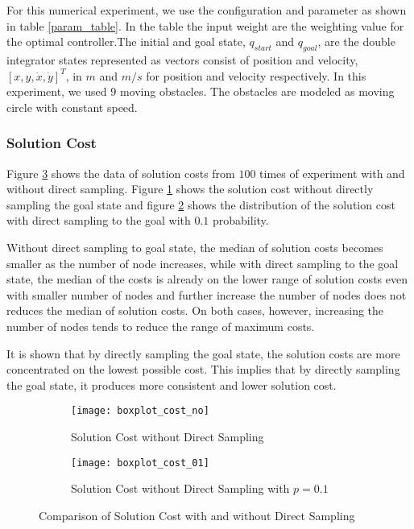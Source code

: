 \documentclass[../thesis.tex]{subfiles}
\begin{document}
For this numerical experiment, we use the configuration and parameter as shown in table \ref{param_table}. In the table the input weight are the weighting value for the optimal controller.The initial and goal state, $q_{start}$ and $q_{goal}$, are the double integrator states represented as vectors consist of position and velocity, $[x,y,\dot{x},\dot{y}]^T$, in $m$ and $m/s$ for position and velocity respectively. In this experiment, we used $9$ moving obstacles. The obstacles are modeled as moving circle with constant speed.

\subsubsection{Solution Cost}
Figure \ref{plot_compare_cost} shows the data of solution costs from $100$ times of experiment with and without direct sampling. Figure \ref{plot_compare_cost:no} shows the solution cost without directly sampling the goal state and figure \ref{plot_compare_cost:0.1} shows the distribution of the solution cost with direct sampling to the goal with $0.1$ probability. 

Without direct sampling to goal state, the median of solution costs becomes smaller as the number of node increases, while with direct sampling to the goal state, the median of the costs is already on the lower range of solution costs even with smaller number of nodes and further increase the number of nodes does not reduces the median of solution costs. On both cases, however, increasing the number of nodes tends to reduce the range of maximum costs.

It is shown that by directly sampling the goal state, the solution costs are more concentrated on the lowest possible cost. This implies that by directly sampling the goal state, it produces more consistent and lower solution cost. 

\begin{figure}[H]
	\centering
	\begin{subfigure}{1\textwidth}
		\centering
		\texttt{[image: boxplot\_cost\_no]}
		\caption{Solution Cost without Direct Sampling}
		\label{plot_compare_cost:no}
	\end{subfigure}
	\begin{subfigure}{1\textwidth}
		\centering
		\texttt{[image: boxplot\_cost\_01]}
		\caption{Solution Cost without Direct Sampling with $p=0.1$}
		\label{plot_compare_cost:0.1}
	\end{subfigure}
	\caption{Comparison of Solution Cost with and without Direct Sampling}
	\label{plot_compare_cost}
\end{figure}
\end{document}
